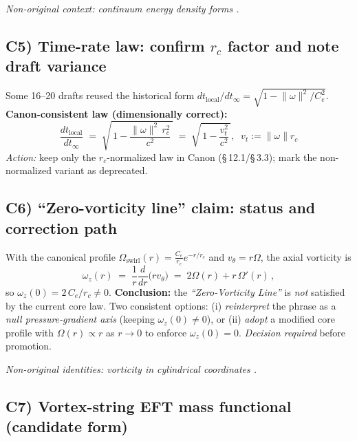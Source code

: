 \documentclass[11pt,a4paper]{article}
\begin{document}
    \textit{Non-original context: continuum energy density forms \cite{LandauFluids}.}

    \subsection*{C5) Time-rate law: confirm $r_c$ factor and note draft variance}
    \label{subsec:timerate-consistency}

    Some 16–20 drafts reused the historical form $dt_{\text{local}}/dt_\infty=\sqrt{1- \lVert\omega\rVert^2/C_e^2}$.
    \textbf{Canon-consistent law (dimensionally correct):}
    \[
        \boxed{ \frac{dt_{\text{local}}}{dt_\infty} \;=\; \sqrt{\,1- \frac{\lVert\omega\rVert^2\,r_c^2}{c^2}\,}
        \;=\; \sqrt{\,1- \frac{v_t^2}{c^2}\,},\;\;v_t:=\lVert\omega\rVert r_c }
    \]
    \emph{Action:} keep only the $r_c$-normalized law in Canon (\S\,12.1/\S\,3.3); mark the non-normalized variant as deprecated.

    \subsection*{C6) ``Zero-vorticity line'' claim: status and correction path}
    \label{subsec:zero-vort-line}

    With the canonical profile $\Omega_{\text{swirl}}(r)=\tfrac{C_e}{r_c} e^{-r/r_c}$ and $v_\theta=r\Omega$, the axial vorticity is
    \[
        \omega_z(r) \;=\; \frac{1}{r}\frac{d}{dr}\!\big(r v_\theta\big) \;=\; 2\Omega(r)+ r\,\Omega'(r)\,,
    \]
    so $\omega_z(0)=2\,C_e/r_c\neq 0$.
    \textbf{Conclusion:} the \emph{``Zero-Vorticity Line''} is \emph{not} satisfied by the current core law.
    Two consistent options:
    (i) \emph{reinterpret} the phrase as a \emph{null pressure-gradient axis} (keeping $\omega_z(0)\neq 0$), or
    (ii) \emph{adopt} a modified core profile with $\Omega(r)\propto r$ as $r\to 0$ to enforce $\omega_z(0)=0$.
    \emph{Decision required} before promotion.

    \textit{Non-original identities: vorticity in cylindrical coordinates \cite{Batchelor1967}.}

    \subsection*{C7) Vortex-string EFT mass functional (candidate form)}
    \label{subsec:vortex-string-mass}
\end{document}
